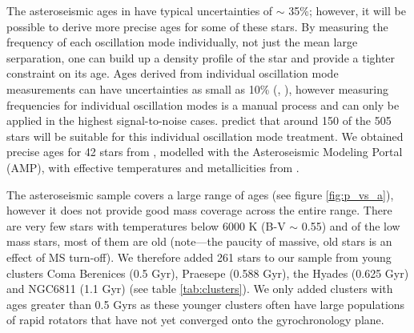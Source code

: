 \documentclass[10pt,preprint]{aastex}
\begin{document}
The asteroseismic ages in \citet{Chaplin2013} have typical uncertainties of $\sim$ 35\%; however, it will be possible to derive more precise ages for some of these stars.
By measuring the frequency of each oscillation mode individually, not just the mean large serparation, one can build up a density profile of the star and provide a tighter constraint on its age.
Ages derived from individual oscillation mode measurements can have uncertainties as small as 10\% (\citet{Brown1994}, \citet{SilvaAguirre2013}), however measuring frequencies for individual oscillation modes is a manual process and can only be applied in the highest signal-to-noise cases.
\citet{Chaplin2013} predict that around 150 of the 505 stars will be suitable for this individual oscillation mode treatment.
We obtained precise ages for 42 stars from \citet{Metcalfe2014}, modelled with the Asteroseismic Modeling Portal (AMP), with effective temperatures and metallicities from \citet{Bruntt2012}.

The asteroseismic sample covers a large range of ages (see figure \ref{fig:p_vs_a}), however it does not provide good mass coverage across the entire range.
There are very few stars with temperatures below 6000 K (B-V $\sim$ 0.55) and of the low mass stars, most of them are old (note---the paucity of massive, old stars is an effect of MS turn-off).
We therefore added 261 stars to our sample from young clusters Coma Berenices (0.5 Gyr), Praesepe (0.588 Gyr), the Hyades (0.625 Gyr) and NGC6811 (1.1 Gyr) (see table \ref{tab:clusters}).
We only added clusters with ages greater than 0.5 Gyrs as these younger clusters often have large populations of rapid rotators that have not yet converged onto the gyrochronology plane.
\end{document}
